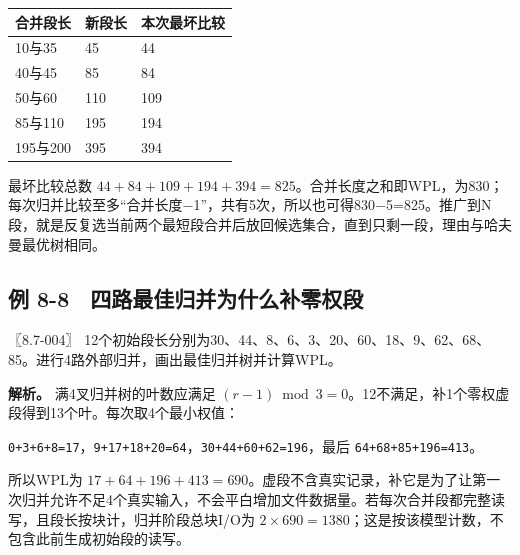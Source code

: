\begin{wideblock}

\par\medskip\noindent\begin{minipage}{\linewidth}\fontsize{9.3}{12}\selectfont\begin{tabularx}{\linewidth}{@{}YYY@{}}
\toprule\noalign{}
合并段长 & 新段长 & 本次最坏比较 \\
\midrule\noalign{}


10与35 & 45 & 44 \\
40与45 & 85 & 84 \\
50与60 & 110 & 109 \\
85与110 & 195 & 194 \\
195与200 & 395 & 394 \\
\bottomrule\end{tabularx}
\end{minipage}\par\medskip

\end{wideblock}

最坏比较总数 \(44+84+109+194+394=825\)。合并长度之和即WPL，为830；每次归并比较至多“合并长度\ensuremath{-}1”，共有5次，所以也可得830\ensuremath{-}5=825。推广到N段，就是反复选当前两个最短段合并后放回候选集合，直到只剩一段，理由与哈夫曼最优树相同。

\subsection{例 8-8　四路最佳归并为什么补零权段}\label{DS08-ex8}

\begin{example}[配套案例]

〖8.7-004〗 12个初始段长分别为30、44、8、6、3、20、60、18、9、62、68、85。进行4路外部归并，画出最佳归并树并计算WPL。

\end{example}

\textbf{解析。} 满4叉归并树的叶数应满足 \((r-1)\bmod3=0\)。12不满足，补1个零权虚段得到13个叶。每次取4个最小权值：

\texttt{0+\allowbreak{}3+\allowbreak{}6+\allowbreak{}8=\allowbreak{}17}，\texttt{9+\allowbreak{}17+\allowbreak{}18+\allowbreak{}20=\allowbreak{}64}，\texttt{30+\allowbreak{}44+\allowbreak{}60+\allowbreak{}62=\allowbreak{}196}，最后 \texttt{64+\allowbreak{}68+\allowbreak{}85+\allowbreak{}196=\allowbreak{}413}。

所以WPL为 \(17+64+196+413=690\)。虚段不含真实记录，补它是为了让第一次归并允许不足4个真实输入，不会平白增加文件数据量。若每次合并段都完整读写，且段长按块计，归并阶段总块I/O为 \(2\times690=1380\)；这是按该模型计数，不包含此前生成初始段的读写。

